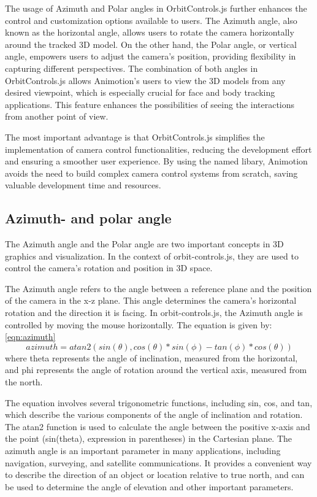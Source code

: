 The usage of Azimuth and Polar angles in OrbitControls.js further enhances the control and customization options available to users.
The Azimuth angle, also known as the horizontal angle, allows users to rotate the camera horizontally around the tracked 3D 
model. On the other hand, the Polar angle, or vertical angle, empowers users to adjust the camera's position, 
providing flexibility in capturing different perspectives.
The combination of both angles in OrbitControls.js allows Animotion's users to view the 3D models from any desired viewpoint, 
which is especially crucial for face and body tracking applications. This feature enhances the possibilities of seeing the 
interactions from another point of view.

The most important advantage is that OrbitControls.js simplifies the implementation of camera control functionalities, 
reducing the development effort and ensuring a smoother user experience. By using the named libary, 
Animotion avoids the need to build complex camera control systems from scratch, saving valuable development time and resources.
\cite{orbitcontrols}

\subsection{Azimuth- and polar angle}
The Azimuth angle and the Polar angle are two important concepts in 3D graphics and visualization. 
In the context of orbit-controls.js, they are used to control the camera's rotation and position in 3D space.

The Azimuth angle refers to the angle between a reference plane and the position of the camera in 
the x-z plane. This angle determines the camera's horizontal rotation and the direction it is facing. 
In orbit-controls.js, the Azimuth angle is controlled by moving the mouse horizontally.
The equation is given by: \ref{eqn:azimuth}
\begin{equation}
  \label{eqn:azimuth}
	azimuth = atan2(sin(\theta), cos(\theta)*sin(\phi) - tan(\phi)*cos(\theta))
\end{equation}
where theta represents the angle of inclination, measured from the horizontal, and phi represents the angle 
of rotation around the vertical axis, measured from the north.

The equation involves several trigonometric functions, including sin, cos, and tan, which describe the various 
components of the angle of inclination and rotation. The atan2 function is used to calculate the angle between 
the positive x-axis and the point (sin(theta), expression in parentheses) in the Cartesian plane.
The azimuth angle is an important parameter in many applications, including navigation, surveying, and satellite communications. 
It provides a convenient way to describe the direction of an object or location relative to true north, 
and can be used to determine the angle of elevation and other important parameters.

